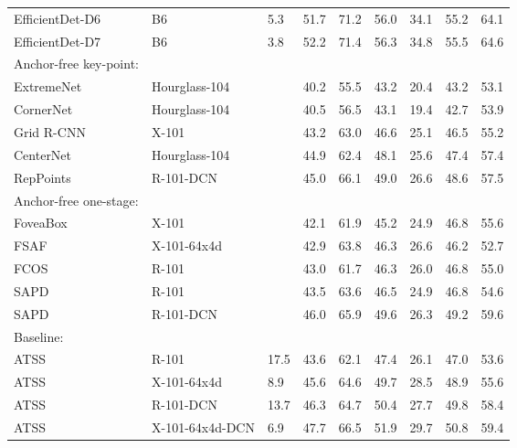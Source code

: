 \begin{table*}[tpb]
\begin{center}
\begin{tabular}{ K{11.0em} | K{8.0em} |K{2.5em} | K{4.2em} K{4.2em} K{4.2em} | K{4.2em} K{4.2em} K{4.2em} }
            EfficientDet-D6~\cite{EfficientDet} & B6 & 5.3 & 51.7 & 71.2 & 56.0 & 34.1 & 55.2 & 64.1  \\
            EfficientDet-D7~\cite{EfficientDet} & B6 & 3.8 & 52.2 & 71.4 & 56.3 & 34.8 & 55.5 & 64.6  \\
             
             \hline
             Anchor-free key-point: &    &  &  &  &  &\\ 
             ExtremeNet~\cite{extremeNet} & Hourglass-104 &  & 40.2 & 55.5 & 43.2 & 20.4 & 43.2 & 53.1  \\
             CornerNet~\cite{cornerNet} & Hourglass-104 &  & 40.5 & 56.5 & 43.1 & 19.4 & 42.7 & 53.9  \\
             Grid R-CNN~\cite{gridRCNN} & X-101 &  & 43.2 & 63.0 & 46.6 & 25.1 & 46.5 & 55.2  \\
             CenterNet~\cite{cornerNet} & Hourglass-104 &  & 44.9 & 62.4 & 48.1 & 25.6 & 47.4 & 57.4  \\
             RepPoints~\cite{repPoints} & R-101-DCN &  & 45.0 & 66.1 & 49.0 & 26.6 & 48.6 & 57.5  \\
             
             \hline
             Anchor-free one-stage: &    &  &  &  &  &\\
             FoveaBox~\cite{foveaBox} & X-101 &  & 42.1 & 61.9 & 45.2 & 24.9 & 46.8 & 55.6  \\
             FSAF~\cite{FSAF} & X-101-64x4d &  & 42.9 & 63.8 & 46.3 & 26.6 & 46.2 & 52.7  \\
             FCOS~\cite{FCOS} & R-101 &   & 43.0 & 61.7 & 46.3 & 26.0 & 46.8 & 55.0  \\
             SAPD~\cite{SAPD} & R-101 &   & 43.5 & 63.6 & 46.5 & 24.9 & 46.8 & 54.6  \\
             SAPD~\cite{SAPD} & R-101-DCN &  & 46.0 & 65.9 & 49.6 & 26.3 & 49.2 & 59.6  \\
             


             
             
             
             \hline
             Baseline: &    &  &  &  &  &\\
             ATSS~\cite{ATSS} & R-101 & 17.5 & 43.6 & 62.1 & 47.4 & 26.1 & 47.0 & 53.6 \\
             ATSS~\cite{ATSS} & X-101-64x4d & 8.9 & 45.6 & 64.6 & 49.7 & 28.5 & 48.9 & 55.6 \\
             ATSS~\cite{ATSS} & R-101-DCN & 13.7 & 46.3 & 64.7 & 50.4 & 27.7 & 49.8 & 58.4 \\
             ATSS~\cite{ATSS} & X-101-64x4d-DCN & 6.9 & 47.7 & 66.5 & 51.9 & 29.7 & 50.8 & 59.4 \\
            

\end{tabular}
\end{center}
\end{table*}
